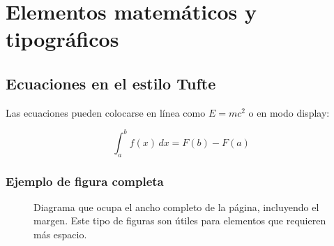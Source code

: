 
\chapter{Elementos matemáticos y tipográficos}

\section{Ecuaciones en el estilo Tufte}

Las ecuaciones pueden colocarse en línea como \(E = mc^2\) o en modo display:

\begin{equation}
\int_a^b f(x)\,dx = F(b) - F(a)
\end{equation}

\subsection{Ejemplo de figura completa}

\begin{figure*}[ht]\centering
\caption{Diagrama que ocupa el ancho completo de la página, incluyendo el margen. Este tipo de figuras son útiles para elementos que requieren más espacio.}
\label{fig:diagrama-completo}
\end{figure*}

\lipsum[1-10] %